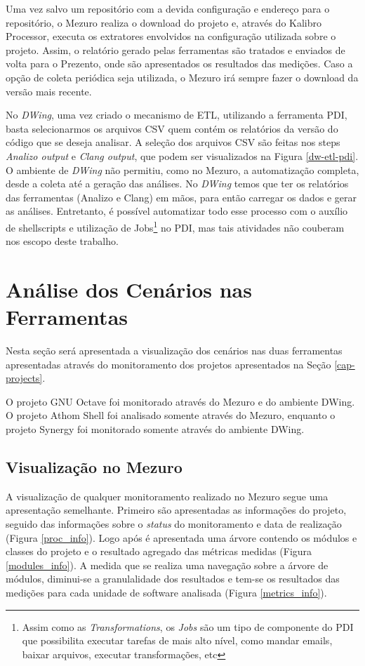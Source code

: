 Uma vez salvo um repositório com a devida configuração e endereço para o repositório, o Mezuro realiza o download do projeto e, através do Kalibro Processor, executa os extratores envolvidos na configuração utilizada sobre o projeto. Assim, o relatório gerado pelas ferramentas são tratados e enviados de volta para o Prezento, onde são apresentados os resultados das medições. Caso a opção de coleta periódica seja utilizada, o Mezuro irá sempre fazer o download da versão mais recente.


No \emph{DWing}, uma vez criado o mecanismo de ETL, utilizando a ferramenta PDI, basta selecionarmos os arquivos  CSV  quem contém os relatórios da versão do código que se deseja analisar. A seleção dos arquivos CSV são feitas nos steps \emph{Analizo output} e \emph{Clang output}, que podem ser visualizados na Figura \ref{dw-etl-pdi}. O ambiente de \emph{DWing} não permitiu, como no Mezuro, a automatização completa, desde a coleta até a geração das análises. No \emph{DWing} temos que ter os relatórios das ferramentas (Analizo e Clang) em mãos, para então carregar os dados e gerar as análises. Entretanto, é possível automatizar todo esse processo com o auxílio de shellscripts e utilização de Jobs\footnote{Assim como as \emph{Transformations}, os \emph{Jobs} são um tipo de componente do PDI que possibilita executar tarefas de mais alto nível, como mandar emails, baixar arquivos, executar transformações, etc} no PDI, mas tais atividades não couberam nos escopo deste trabalho.


\section{Análise dos Cenários nas Ferramentas}

Nesta seção será apresentada a visualização dos cenários nas duas ferramentas apresentadas através do monitoramento dos projetos apresentados na Seção \ref{cap-projects}.

O projeto GNU Octave foi monitorado através do Mezuro e do ambiente DWing. O projeto Athom Shell foi analisado somente através do Mezuro, enquanto o projeto Synergy foi monitorado somente através do ambiente DWing.

\subsection{Visualização no Mezuro}
\label{vision-mezuro}

A visualização de qualquer monitoramento realizado no Mezuro segue uma apresentação semelhante. Primeiro são apresentadas as informações do projeto, seguido das informações sobre o \emph{status} do monitoramento e data de realização (Figura \ref{proc_info}). Logo após é apresentada uma árvore contendo os módulos e classes do projeto e o resultado agregado das métricas medidas  (Figura \ref{modules_info}). A medida que se realiza uma navegação sobre a árvore de módulos, diminui-se a granulalidade dos resultados e tem-se os resultados das medições para cada unidade de software analisada (Figura \ref{metrics_info}).

